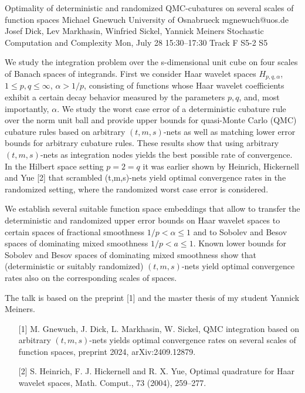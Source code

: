 \begin{talk}
  {Optimality of deterministic and randomized QMC-cubatures on several scales of function spaces}%
  {Michael Gnewuch}%
  {University of Osnabrueck}%
  {mgnewuch@uos.de}%
  {Josef Dick, Lev Markhasin, Winfried Sickel, Yannick Meiners}%
  {Stochastic Computation and Complexity}%
  {Mon, July 28 15:30–17:30 Track F}%
  {S5-2}%
  {S5}%
				
			
			
We study the integration problem over the s-dimensional unit cube on four scales of Banach spaces of integrands. First we consider Haar wavelet spaces $H_{p, q, \alpha}$, $1\le p, q \le \infty$, $\alpha > 1/p$, consisting of functions whose Haar wavelet coefficients exhibit a certain decay behavior measured by the parameters $p,q$, and, most importantly, $\alpha$.  We study the worst case error of a deterministic cubature rule over the norm unit ball 
and provide upper bounds for quasi-Monte Carlo (QMC) cubature rules based on arbitrary $(t,m,s)$-nets as well as matching lower error bounds for arbitrary cubature rules. These results show that using arbitrary $(t,m,s)$-nets as integration nodes yields the best possible rate of convergence. In the Hilbert space setting $p=2 = q$ it was earlier shown by Heinrich, Hickernell and Yue [2]  that scrambled (t,m,s)-nets yield optimal convergence rates in the randomized setting, where the randomized worst case error is considered. 

We establish several suitable function space embeddings that allow to transfer the deterministic and randomized upper error bounds on Haar wavelet spaces
to certain spaces of fractional smoothness $1/p < \alpha  \le 1$ and to Sobolev and Besov spaces of dominating mixed smoothness $1/p < a \le 1$.
Known lower bounds for Sobolev and Besov spaces of dominating mixed smoothness show that (deterministic or suitably randomized) $(t,m,s)$-nets yield optimal convergence rates also on the corresponding scales of spaces.			

The talk is based on the preprint [1] and the master thesis of my student Yannick Meiners.
\medskip

\begin{enumerate}
	\item[{[1]}] M. Gnewuch, J. Dick, L. Markhasin, W. Sickel, QMC integration based on arbitrary $(t,m,s)$-nets yields optimal convergence rates on several scales of function spaces, preprint 2024, arXiv:2409.12879. 
        \item[{[2]}] S. Heinrich, F. J. Hickernell and R. X. Yue, Optimal quadrature for Haar wavelet spaces, Math. Comput., 73 (2004), 259–277.
	\end{enumerate}

\end{talk}

